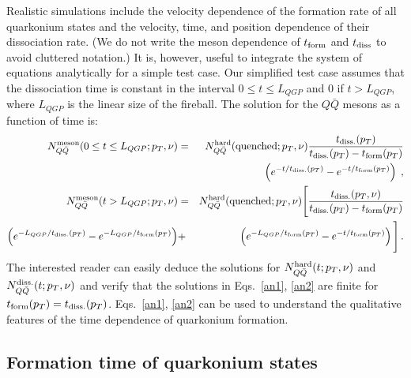 \documentclass[article,showpacs,preprintnumbers,amsmath,amssymb]{revtex4}
\newcommand{\rf}{{\rm form}}
\newcommand{\rd}{{\rm diss}}
\begin{document}
Realistic simulations include the velocity dependence of the formation rate of
all quarkonium states and the velocity, time, and position dependence of their
dissociation rate. (We do not write the meson dependence of $t_{\rf}$ and
$t_{\rd}$ to avoid cluttered notation.) It is, however, useful to integrate the
system of equations analytically for a simple test case.  Our simplified test
case assumes that the dissociation time is constant in the interval $ 0 \leq t
\leq L_{QGP}$ and 0 if $t > L_{QGP}$, where $L_{QGP}$ is the linear size of the
fireball.  The solution for the $Q\bar{Q}$ mesons as a function of time is:
\begin{eqnarray}
\nonumber
N^{\rm meson}_{Q\bar{Q}}( 0 \leq t \leq L_{QGP};p_T,\nu) 
  & = &  N^{\rm hard}_{Q\bar{Q}}({\rm{quenched}};p_T,\nu)
\frac{ t_{\rm diss.}(p_T)} {t_{\rm diss.}(p_T) -t_{\rm form}(p_T)
}\\
\label{an1} 
& &\left( e^{-t/  t_{\rm diss.}(p_T)} -  e^{-t/  t_{\rm form}(p_T)}  \right) 
\;, \\
\nonumber
 N^{\rm meson}_{Q\bar{Q}}(t>L_{QGP};p_T,\nu) 
  & = &  N^{\rm hard}_{Q\bar{Q}}({\rm{quenched}};p_T,\nu) \Bigg[
\frac{ t_{\rm diss.}(p_T,\nu)} {t_{\rm diss.}(p_T) -t_{\rm form}(p_T)
}\\
\label{an2}
\left( e^{-L_{QGP}/  t_{\rm diss.}(p_T)} -  e^{-L_{QGP}/  t_{\rm form}(p_T)}  \right)
&+&\left(   e^{-L_{QGP}/  t_{\rm form}(p_T)}  -   e^{-t/  t_{\rm form}(p_T)}    \right)   \Bigg]  \, . 
\end{eqnarray}
The interested reader can easily deduce the solutions for $N^{\rm
hard}_{Q\bar{Q}}(t;p_T,\nu)$ and $N^{\rm diss.}_{Q\bar{Q}}(t;p_T,\nu)$
and verify that the solutions in Eqs.~\ref{an1}, \ref{an2} are finite for $
t_{\rm form}(p_T) = t_{\rm diss.}(p_T) $. Eqs.~\ref{an1}, \ref{an2} 
can be used to understand the qualitative features of the time dependence of quarkonium formation.


\subsection{Formation time of quarkonium states }
\end{document}
